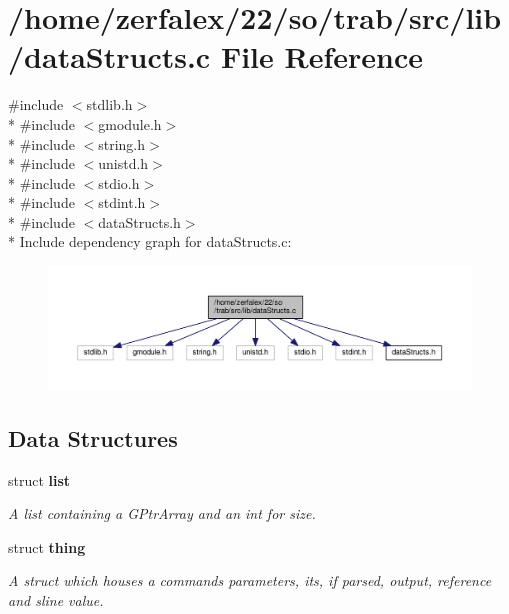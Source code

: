 \section{/home/zerfalex/22/so/trab/src/lib/data\+Structs.c File Reference}
\label{data_structs_8c}
{\ttfamily \#include $<$stdlib.\+h$>$}\\*
{\ttfamily \#include $<$gmodule.\+h$>$}\\*
{\ttfamily \#include $<$string.\+h$>$}\\*
{\ttfamily \#include $<$unistd.\+h$>$}\\*
{\ttfamily \#include $<$stdio.\+h$>$}\\*
{\ttfamily \#include $<$stdint.\+h$>$}\\*
{\ttfamily \#include $<$data\+Structs.\+h$>$}\\*
Include dependency graph for data\+Structs.\+c\+:\nopagebreak
\begin{figure}[H]
\begin{center}
\leavevmode
\includegraphics[width=350pt]{data_structs_8c__incl}
\end{center}
\end{figure}
\subsection*{Data Structures}
\begin{DoxyCompactItemize}
\item 
struct {\bf list}
\begin{DoxyCompactList}\small\item\em A list containing a G\+Ptr\+Array and an int for size. \end{DoxyCompactList}\item 
struct {\bf thing}
\begin{DoxyCompactList}\small\item\em A struct which houses a command\textquotesingle{}s parameters, it\textquotesingle{}s, if parsed, output, reference and sline value. \end{DoxyCompactList}\end{DoxyCompactItemize}
